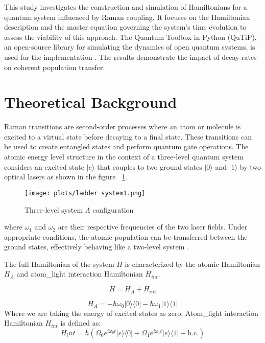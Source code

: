 \documentclass{article}
\begin{document}
This study investigates the construction and simulation of Hamiltonians for a quantum system influenced by Raman coupling. It focuses on the Hamiltonian description and the master equation governing the system's time evolution to assess the viability of this approach. The Quantum Toolbox in Python (QuTiP), an open-source library for simulating the dynamics of open quantum systems, is used for the implementation \cite{Johansson2013}. The results demonstrate the impact of decay rates on coherent population transfer.


\section{Theoretical Background}
Raman transitions are second-order processes where an atom or molecule is excited to a virtual state before decaying to a final state. These transitions can be used to create entangled states and perform quantum gate operations.
The atomic energy level structure in the context of a three-level quantum system considers an excited state $|e\rangle$ that couples to two ground states $|0\rangle$ and $|1\rangle$ by two optical lasers as shown in the figure  ~\ref{fig:lam}. 


\begin{figure}[h]
\centering
\texttt{[image: plots/ladder system1.png]}
\caption{Three-level system \(\Lambda\) configuration}
\label{fig:lam}
\end{figure}

where \(\omega_1\) and \(\omega_2\) are their respective frequencies of the two laser fields. Under appropriate conditions, the atomic population can be transferred between the ground states, effectively behaving like a two-level system \cite{QuantumWorldUltraColdBook2}. 

The full Hamiltonian of the system $H$ is characterized by the atomic Hamiltonian $H_{A}$ and atom\_light interaction Hamiltonian  $H_{int}$. 

\begin{equation}
    H = H_{A} + H_{int}
\end{equation}

\begin{equation}
    H_{A} = -\hbar \omega_{0} |0\rangle\langle 0| -\hbar \omega_{1} |1\rangle\langle 1| 
\end{equation}
Where we are taking the energy of excited states as zero.
Atom\_light interaction Hamiltonian  $H_{int}$ is defined as:
\begin{equation}
H_int =  \hbar \left( \Omega_0 e^{i\omega_0 t} |e\rangle \langle 0| + \Omega_1 e^{i\omega_1 t} |e\rangle \langle 1| + \text{h.c.} \right)
\end{equation}
\end{document}
